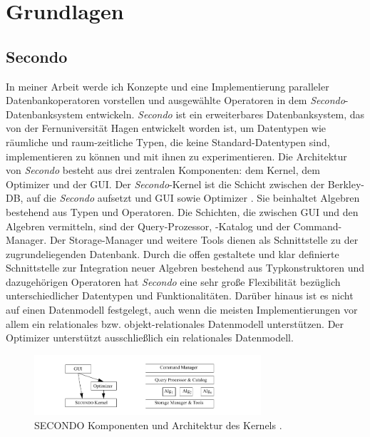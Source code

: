 \documentclass[a4paper,12pt,twoside]{article}
\newcommand{\Fb}[1]{\textit{#1}} %
\begin{document}
\section{Grundlagen}

\subsection{Secondo}

In meiner Arbeit werde ich Konzepte und eine Implementierung paralleler Datenbankoperatoren vorstellen und ausgewählte Operatoren in dem \Fb{Secondo}-Datenbanksystem entwickeln. \Fb{Secondo} \parencite{Gueting2010} ist ein erweiterbares Datenbanksystem, das von der Fernuniversität Hagen entwickelt worden ist, um Datentypen wie räumliche und raum-zeitliche Typen, die keine Standard-Datentypen sind, implementieren zu können und mit ihnen zu experimentieren. Die Architektur von \Fb{Secondo} besteht aus drei zentralen Komponenten: dem Kernel, dem Optimizer und der GUI. Der \Fb{Secondo}-Kernel ist die Schicht zwischen der Berkley-DB, auf die \Fb{Secondo} aufsetzt und GUI sowie Optimizer \parencite{Gueting2017}. Sie beinhaltet Algebren bestehend aus Typen und Operatoren. Die Schichten, die zwischen GUI und den Algebren vermitteln, sind der Query-Prozessor, -Katalog und der Command-Manager. Der Storage-Manager und weitere Tools dienen als Schnittstelle zu der zugrundeliegenden Datenbank. Durch die offen gestaltete und klar definierte Schnittstelle zur Integration neuer Algebren bestehend aus Typkonstruktoren und dazugehörigen Operatoren hat \Fb{Secondo} eine sehr große Flexibilität bezüglich unterschiedlicher Datentypen und Funktionalitäten. Darüber hinaus ist es nicht auf einen Datenmodell festgelegt, auch wenn die meisten Implementierungen vor allem ein relationales bzw. objekt-relationales Datenmodell unterstützen. Der Optimizer unterstützt ausschließlich ein relationales Datenmodell. 

\begin{figure}
	\centering
	\includegraphics[width=0.75\textwidth]{Bilder/secondo.png}
	\caption{SECONDO Komponenten und Architektur des Kernels \parencite{Gueting2010}.}
	\label{img:secondo}
\end{figure}
\end{document}
